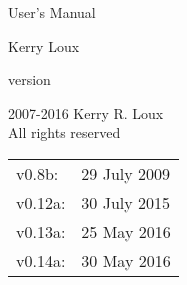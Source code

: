 \documentclass[oneside]{memoir}
\begin{document}
\frontmatter
{}%
\pagestyle{empty}

\vspace*{\fill}
\begin{center}
\HUGE\textsf{\VVASE{}}\par
\end{center}

\begin{center}
\Huge\textsf{User's Manual}\par
\end{center}

\begin{center}
\LARGE\textsf{Kerry Loux}\par
\medskip
\normalsize\textsf{version \version}\par
\end{center}
\vspace*{\fill}

\clearpage



\begingroup
\footnotesize
\setlength{\parindent}{0pt}
\setlength{\parskip}{\baselineskip}
\textcopyright{} 2007-2016 Kerry R. Loux \\
All rights reserved

\begin{center}
\begin{tabular}{ll}
v0.8b:   & 29 July 2009 \\
v0.12a:  & 30 July 2015 \\
v0.13a:  & 25 May 2016 \\
v0.14a:  & 30 May 2016 \\
\end{tabular}
\end{center}
\endgroup

\clearpage

\pagestyle{headings}

\tableofcontents
\setlength{\unitlength}{1pt}
\clearpage

\pagestyle{ruled}




\mainmatter






\end{document}
